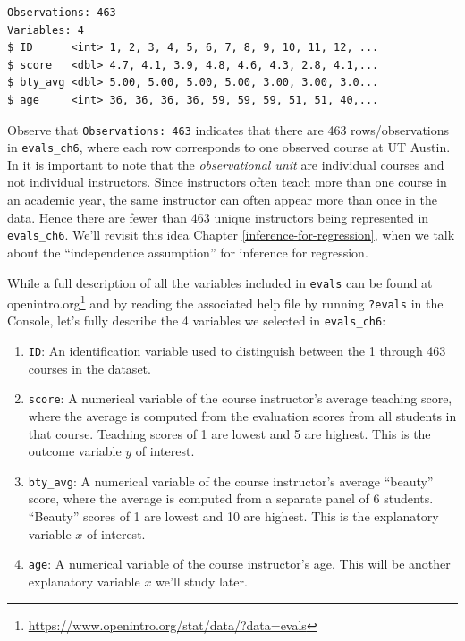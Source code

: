 \documentclass[12pt, krantz2,]{krantz}
\providecommand{\tightlist}{%
  \setlength{\itemsep}{0pt}\setlength{\parskip}{0pt}}
\renewcommand{\href}[2]{#2\footnote{\url{#1}}}
\begin{document}
\begin{verbatim}
Observations: 463
Variables: 4
$ ID      <int> 1, 2, 3, 4, 5, 6, 7, 8, 9, 10, 11, 12, ...
$ score   <dbl> 4.7, 4.1, 3.9, 4.8, 4.6, 4.3, 2.8, 4.1,...
$ bty_avg <dbl> 5.00, 5.00, 5.00, 5.00, 3.00, 3.00, 3.0...
$ age     <int> 36, 36, 36, 36, 59, 59, 59, 51, 51, 40,...
\end{verbatim}

Observe that \texttt{Observations:\ 463} indicates that there are 463 rows/observations in \texttt{evals\_ch6}, where each row corresponds to one observed course at UT Austin. In it is important to note that the \emph{observational unit} are individual courses and not individual instructors. Since instructors often teach more than one course in an academic year, the same instructor can often appear more than once in the data. Hence there are fewer than 463 unique instructors being represented in \texttt{evals\_ch6}. We'll revisit this idea Chapter \ref{inference-for-regression}, when we talk about the ``independence assumption'' for inference for regression.

While a full description of all the variables included in \texttt{evals} can be found at \href{https://www.openintro.org/stat/data/?data=evals}{openintro.org} and by reading the associated help file by running \texttt{?evals} in the Console, let's fully describe the 4 variables we selected in \texttt{evals\_ch6}:

\begin{enumerate}
\def\labelenumi{\arabic{enumi}.}
\tightlist
\item
  \texttt{ID}: An identification variable used to distinguish between the 1 through 463 courses in the dataset.
\item
  \texttt{score}: A numerical variable of the course instructor's average teaching score, where the average is computed from the evaluation scores from all students in that course. Teaching scores of 1 are lowest and 5 are highest. This is the outcome variable \(y\) of interest.
\item
  \texttt{bty\_avg}: A numerical variable of the course instructor's average ``beauty'' score, where the average is computed from a separate panel of 6 students. ``Beauty'' scores of 1 are lowest and 10 are highest. This is the explanatory variable \(x\) of interest.
\item
  \texttt{age}: A numerical variable of the course instructor's age. This will be another explanatory variable \(x\) we'll study later.
\end{enumerate}
\end{document}
